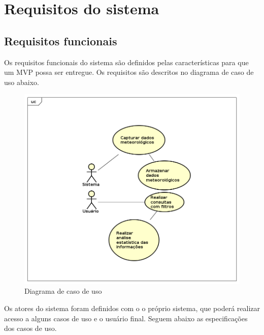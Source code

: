 \chapter{Requisitos do sistema}

\section{Requisitos funcionais}

Os requisitos funcionais do sistema são definidos pelas características para que um MVP possa ser entregue.
Os requisitos são descritos no diagrama de caso de uso abaixo.

\begin{figure}[!htb]
    \label{figure_diagrama_caso_uso}
    \centering
    \caption{Diagrama de caso de uso} \label{includegraphics_diagrama_caso_uso}
    \includegraphics[scale=0.6]{diagrams/caso_de_uso.png}
    \hfill
\end{figure}

Os atores do sistema foram definidos com o o próprio sistema, que poderá realizar acesso a alguns casos de uso e o usuário final.
Seguem abaixo as especificações dos casos de uso.

